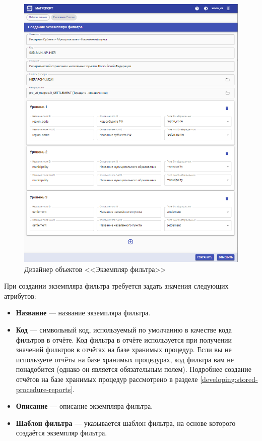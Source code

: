 \documentclass[../user-manual.tex]{subfiles}
\begin{document}
	\begin{figure}[h]
		\centering
		\includegraphics[width=\graphicswidth]{img/4-create-filter-instance.png}
		\caption{Дизайнер объектов <<Экземпляр фильтра>>}
		\label{fig:create-filter-instance}
	\end{figure}

	При создании экземпляра фильтра требуется задать значения следующих атрибутов:
	
	\begin{itemize}
		
		\item \textbf{Название} --- название экземпляра фильтра.
		
		\item \textbf{Код} --- символьный код, используемый по умолчанию в качестве кода фильтров в отчёте. Код фильтра в отчёте используется при получении значений фильтров в отчётах на базе хранимых процедур. Если вы не используете отчёты на базе хранимых процедурах, код фильтра вам не понадобится (однако он является обязательным полем). Подробнее создание отчётов на базе хранимых процедур рассмотрено в разделе \ref{developing:stored-procedure-reports}.
		
		\item \textbf{Описание} --- описание экземпляра фильтра.
		
		\item \textbf{Шаблон фильтра} --- указывается шаблон фильтра, на основе которого создаётся экземпляр фильтра.
		
	\end{itemize}
\end{document}
